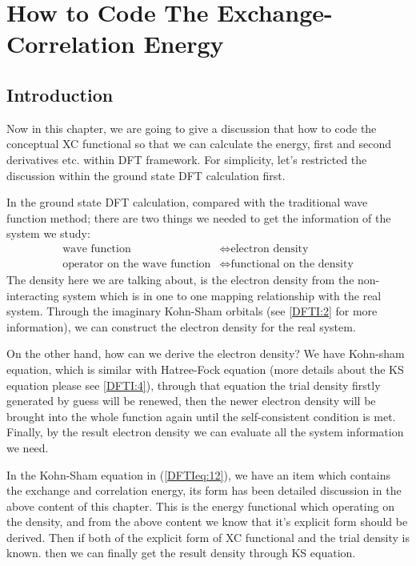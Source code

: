 
\chapter{How to Code The Exchange-Correlation Energy}
%
%
%
%
%

\section{Introduction}
\label{sec:XC_functional}
%
%
%
%
Now in this chapter, we are going to give a discussion that how to
code the conceptual XC functional so that we can calculate the energy,
first and second derivatives etc. within DFT framework. For
simplicity, let's restricted the discussion within the ground state
DFT calculation first.

In the ground state DFT calculation, compared with the traditional
wave function method; there are two things we needed to get the
information of the system we study:
\begin{align}
 \label{eq:XC_functional.1}
\text{wave function} &\Leftrightarrow \text{electron density} \nonumber
\\
\text{operator on the wave function} &\Leftrightarrow \text{functional
  on the density}
\end{align}
The density here we are talking about, is the electron density from
the non-interacting system which is in one to one mapping relationship
with the real system. Through the imaginary Kohn-Sham orbitals (see
\ref{DFTI:2} for more information), we can construct the electron
density for the real system.

On the other hand, how can we derive the electron density? We have
Kohn-sham equation, which is similar with Hatree-Fock equation (more
details about the KS equation please see \ref{DFTI:4}), through that
equation the trial density firstly generated by guess will be renewed,
then the newer electron density will be brought into the whole
function again until the self-consistent condition is met. Finally, by
the result electron density we can evaluate all the system information
we need.

In the Kohn-Sham equation in (\ref{DFTIeq:12}), we have an item which
contains the exchange and correlation energy, its form has been
detailed discussion in the above content of this chapter. This is the
energy functional which operating on the density, and from the above
content we know that it's explicit form should be derived. Then if
both of the explicit form of XC functional and the trial density is
known. then we can finally get the result density through KS equation.

